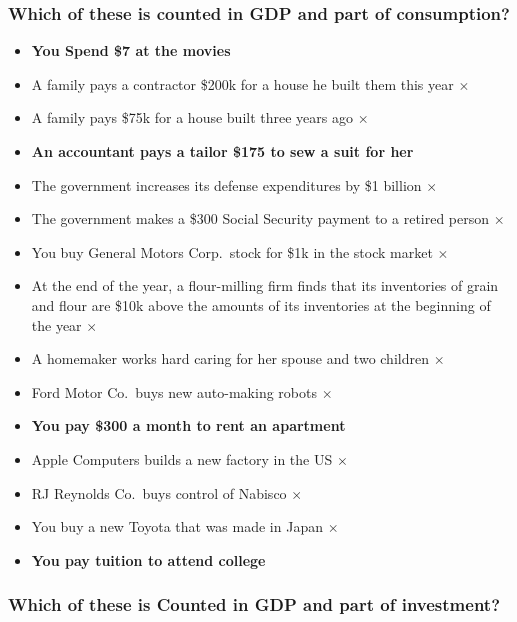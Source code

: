 \documentclass[
  letterpaper,
  DIV=11,
  numbers=noendperiod]{scrartcl}
\providecommand{\tightlist}{%
  \setlength{\itemsep}{0pt}\setlength{\parskip}{0pt}}\usepackage{longtable,booktabs,array}
\begin{document}
\subsubsection{Which of these is counted in GDP and part of
consumption?}\label{which-of-these-is-counted-in-gdp-and-part-of-consumption}

\begin{itemize}
\tightlist
\item
  \textbf{You Spend \$7 at the movies}
\item
  A family pays a contractor \$200k for a house he built them this year
  \(\times\)
\item
  A family pays \$75k for a house built three years ago \(\times\)
\item
  \textbf{An accountant pays a tailor \$175 to sew a suit for her}
\item
  The government increases its defense expenditures by \$1 billion
  \(\times\)
\item
  The government makes a \$300 Social Security payment to a retired
  person \(\times\)
\item
  You buy General Motors Corp.~stock for \$1k in the stock market
  \(\times\)
\item
  At the end of the year, a flour-milling firm finds that its
  inventories of grain and flour are \$10k above the amounts of its
  inventories at the beginning of the year \(\times\)
\item
  A homemaker works hard caring for her spouse and two children
  \(\times\)
\item
  Ford Motor Co.~buys new auto-making robots \(\times\)
\item
  \textbf{You pay \$300 a month to rent an apartment}
\item
  Apple Computers builds a new factory in the US \(\times\)
\item
  RJ Reynolds Co.~buys control of Nabisco \(\times\)
\item
  You buy a new Toyota that was made in Japan \(\times\)
\item
  \textbf{You pay tuition to attend college}
\end{itemize}

\subsubsection{Which of these is Counted in GDP and part of
investment?}\label{which-of-these-is-counted-in-gdp-and-part-of-investment}
\end{document}
